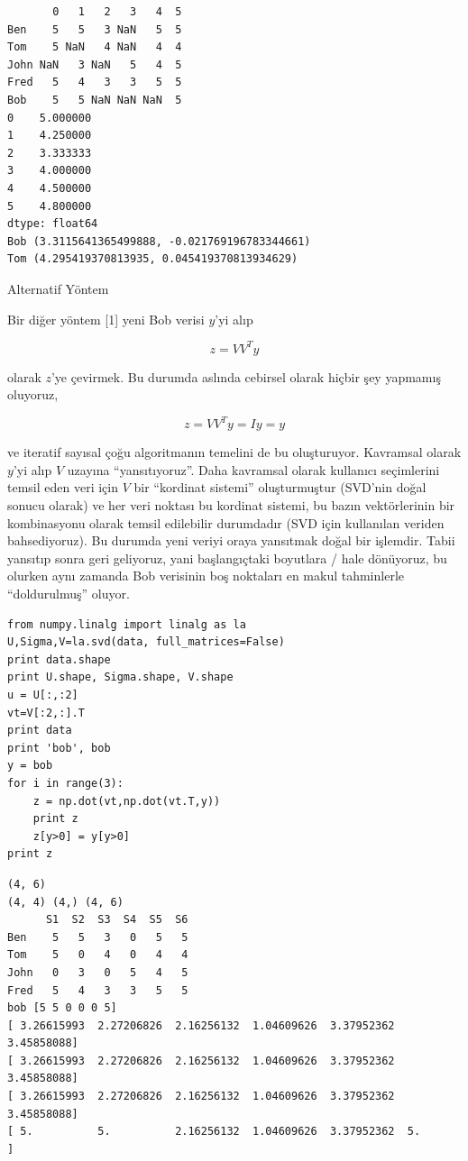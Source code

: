 \documentclass[12pt,fleqn]{article}\usepackage{../../common}
\begin{document}
\begin{verbatim}
       0   1   2   3   4  5
Ben    5   5   3 NaN   5  5
Tom    5 NaN   4 NaN   4  4
John NaN   3 NaN   5   4  5
Fred   5   4   3   3   5  5
Bob    5   5 NaN NaN NaN  5
0    5.000000
1    4.250000
2    3.333333
3    4.000000
4    4.500000
5    4.800000
dtype: float64
Bob (3.3115641365499888, -0.021769196783344661)
Tom (4.295419370813935, 0.045419370813934629)
\end{verbatim}

Alternatif Yöntem

Bir diğer yöntem [1] yeni Bob verisi $y$'yi alıp

$$ z = VV^Ty $$

olarak $z$'ye çevirmek. Bu durumda aslında cebirsel olarak hiçbir şey
yapmamış oluyoruz,

$$ z = VV^Ty = Iy = y$$

ve iteratif sayısal çoğu algoritmanın temelini de bu oluşturuyor. Kavramsal
olarak $y$'yi alıp $V$ uzayına ``yansıtıyoruz''. Daha kavramsal olarak kullanıcı
seçimlerini temsil eden veri için $V$ bir ``kordinat sistemi'' oluşturmuştur
(SVD'nin doğal sonucu olarak) ve her veri noktası bu kordinat sistemi, bu bazın
vektörlerinin bir kombinasyonu olarak temsil edilebilir durumdadır (SVD için
kullanılan veriden bahsediyoruz). Bu durumda yeni veriyi oraya yansıtmak doğal
bir işlemdir. Tabii yansıtıp sonra geri geliyoruz, yani başlangıçtaki boyutlara
/ hale dönüyoruz, bu olurken aynı zamanda Bob verisinin boş noktaları en makul
tahminlerle ``doldurulmuş'' oluyor.

\begin{verbatim}
from numpy.linalg import linalg as la
U,Sigma,V=la.svd(data, full_matrices=False)
print data.shape
print U.shape, Sigma.shape, V.shape
u = U[:,:2]
vt=V[:2,:].T
print data
print 'bob', bob
y = bob
for i in range(3):
    z = np.dot(vt,np.dot(vt.T,y))
    print z
    z[y>0] = y[y>0]
print z
\end{verbatim}

\begin{verbatim}
(4, 6)
(4, 4) (4,) (4, 6)
      S1  S2  S3  S4  S5  S6
Ben    5   5   3   0   5   5
Tom    5   0   4   0   4   4
John   0   3   0   5   4   5
Fred   5   4   3   3   5   5
bob [5 5 0 0 0 5]
[ 3.26615993  2.27206826  2.16256132  1.04609626  3.37952362  3.45858088]
[ 3.26615993  2.27206826  2.16256132  1.04609626  3.37952362  3.45858088]
[ 3.26615993  2.27206826  2.16256132  1.04609626  3.37952362  3.45858088]
[ 5.          5.          2.16256132  1.04609626  3.37952362  5.        ]
\end{verbatim}
\end{document}

